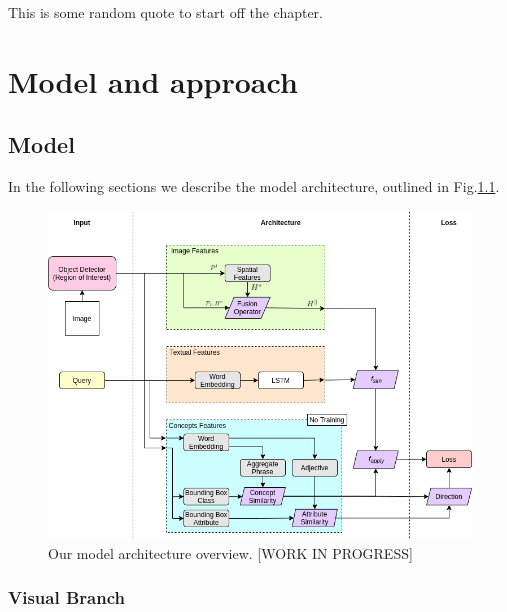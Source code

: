 \begin{savequote}[75mm]
This is some random quote to start off the chapter.
\end{savequote}

\chapter{Model and approach}


\section{Model}

In the following sections we describe the model architecture, outlined
in Fig.\ref{fig:model-architecture}.

\begin{figure}
  \centering
  \includegraphics[width=1.0\textwidth]{figures/model-architecture.png}
  \caption[TODO]{Our model architecture overview. [WORK IN PROGRESS]}
  \label{fig:model-architecture}
\end{figure}

\subsection{Visual Branch}
\label{subsec:visual-branch}


